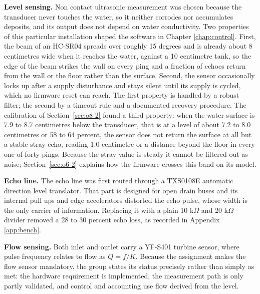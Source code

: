 \textbf{Level sensing.} Non contact ultrasonic measurement was chosen because the transducer never touches the water, so it neither corrodes nor accumulates deposits, and its output does not depend on water conductivity. Two properties of this particular installation shaped the software in Chapter \ref{chap:control}. First, the beam of an HC-SR04 spreads over roughly 15 degrees and is already about 8 centimetres wide when it reaches the water, against a 10 centimetre tank, so the edge of the beam strikes the wall on every ping and a fraction of echoes return from the wall or the floor rather than the surface. Second, the sensor occasionally locks up after a supply disturbance and stays silent until its supply is cycled, which no firmware reset can reach. The first property is handled by a robust filter; the second by a timeout rule and a documented recovery procedure. The calibration of Section~\ref{sec:o8-2} found a third property: when the water surface is 7.9 to 8.7 centimetres below the transducer, that is at a level of about 7.2 to 8.0 centimetres or 58 to 64 percent, the sensor does not return the surface at all but a stable stray echo, reading 1.0 centimetre or a distance beyond the floor in every one of forty pings. Because the stray value is steady it cannot be filtered out as noise; Section~\ref{sec:o6-2} explains how the firmware crosses this band on its model.

\textbf{Echo line.} The echo line was first routed through a TXS0108E automatic direction level translator. That part is designed for open drain buses and its internal pull ups and edge accelerators distorted the echo pulse, whose width is the only carrier of information. Replacing it with a plain 10 k$\Omega$ and 20 k$\Omega$ divider removed a 28 to 30 percent echo loss, as recorded in Appendix \ref{app:bench}.

\textbf{Flow sensing.} Both inlet and outlet carry a YF-S401 turbine sensor, where pulse frequency relates to flow as $Q = f/K$. Because the assignment makes the flow sensor mandatory, the group states its status precisely rather than simply as met: the hardware requirement is implemented, the measurement path is only partly validated, and control and accounting use flow derived from the level.

